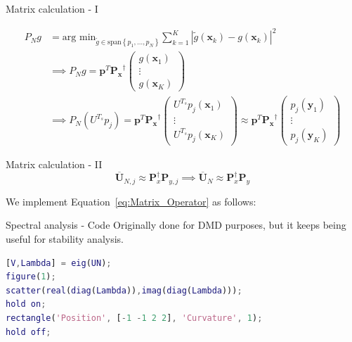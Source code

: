 \documentclass{beamer}
\begin{document}
\begin{frame}{Matrix calculation - I}

    \begin{align}
        P_N g &= \text{arg min}_{\tilde{g} \in \text{span}\left\{p_1 , \dots , p_N\right\}} \sum_{k=1}^K \left|\tilde{g}\left(\mathbf{x}_k\right) - g\left(\mathbf{x}_k\right)\right|^2 \\
        &\implies P_N g = \mathbf{p}^T \mathbf{P_x}^\dagger
        \begin{pmatrix}
            g\left(\mathbf{x}_1\right) \\
            \vdots \\
            g\left(\mathbf{x}_K\right)
        \end{pmatrix} \\
        & \implies P_N \left(U^{T_s} p_j\right) = \mathbf{p}^T \mathbf{P_x}^\dagger
        \begin{pmatrix}
            U^{T_s} p_j\left(\mathbf{x}_1\right) \\
            \vdots \\
            U^{T_s} p_j\left(\mathbf{x}_K\right)
        \end{pmatrix}
        \approx \mathbf{p}^T \mathbf{P_x}^\dagger
        \begin{pmatrix}
            p_j\left(\mathbf{y}_1\right) \\
            \vdots \\
            p_j\left(\mathbf{y}_K\right)
        \end{pmatrix}
    \end{align}
\end{frame}

\begin{frame}{Matrix calculation - II}
    \begin{equation} \label{eq:Matrix_Operator}
        \overline{\mathbf{U}}_{N,j} \approx \mathbf{P}_x^\dagger \mathbf{P}_{y,j} \implies \overline{\mathbf{U}}_N \approx \mathbf{P}_x^\dagger \mathbf{P}_y
    \end{equation}
    
    We implement Equation~\ref{eq:Matrix_Operator} as follows:

    \begin{center}
    \end{center}
\end{frame}

\begin{frame}[fragile]{Spectral analysis - Code}
    Originally done for DMD purposes, but it keeps being useful for stability analysis.

    \begin{lstlisting}[language=Matlab]
[V,Lambda] = eig(UN);
figure(1);
scatter(real(diag(Lambda)),imag(diag(Lambda)));
hold on;
rectangle('Position', [-1 -1 2 2], 'Curvature', 1);
hold off;
    \end{lstlisting}
\end{frame}
\end{document}
